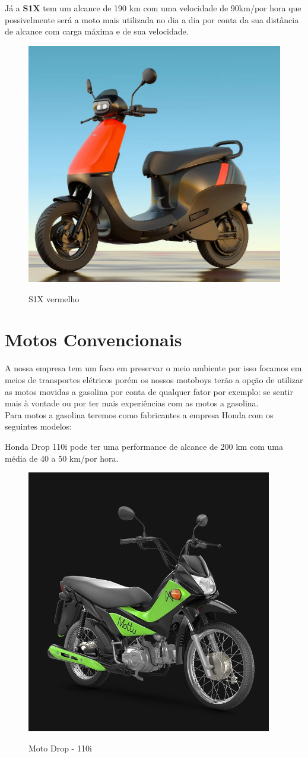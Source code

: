 Já a \textbf{S1X} tem um alcance de 190 km com uma velocidade de 90km/por hora que possivelmente será a moto mais utilizada no dia a dia por conta da sua distância de alcance com carga máxima e de sua velocidade.

\begin{figure} [!ht]
    {\centering
    \caption{S1X vermelho}
    \includegraphics[height=0.2\linewidth]{figuras/S1X.png}
    \label{fig:enter-label}
    }
\end{figure}

   \section{Motos Convencionais}

   A nossa empresa tem um foco em preservar o meio ambiente por isso focamos em meios de transportes elétricos porém os nossos motoboys terão a opção de utilizar as motos movidas a gasolina por conta de qualquer fator por exemplo: se sentir mais à vontade ou por ter mais experiências com as motos a gasolina.\\ 
   
   Para motos a gasolina teremos como fabricantes a empresa Honda com os seguintes modelos:
   
   Honda Drop 110i pode ter uma performance de alcance de 200 km com uma média de 40 a 50 km/por hora.\\

   \begin{figure} [!ht]
       {\centering
       \caption{Moto Drop - 110i}
       \includegraphics[height=0.3\linewidth]{figuras/Drop110.png}
       \label{fig:enter-label}
       }
   \end{figure}
   
